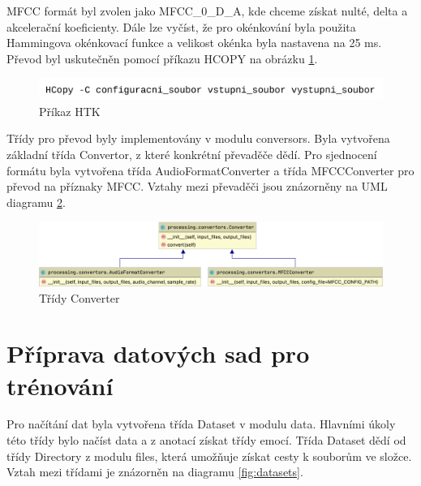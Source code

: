\documentclass[FM,BP]{tulthesis}
\begin{document}
MFCC formát byl zvolen jako MFCC\_0\_D\_A, kde chceme získat nulté, delta a akcelerační koeficienty. Dále lze vyčíst, že pro okénkování byla použita Hammingova okénkovací funkce a velikost okénka byla nastavena na 25 ms. Převod byl uskutečněn pomocí příkazu HCOPY na obrázku \ref{fig:htk}.

\begin{figure}[htbp]
\centerline{\includegraphics[width=\textwidth,height=\textheight,keepaspectratio]{htk_command.png}}
\caption{Příkaz HTK}
\label{fig:htk}
\end{figure}
\FloatBarrier

Třídy pro převod byly implementovány v modulu conversors. Byla vytvořena základní třída Convertor, z které konkrétní převaděče dědí. Pro sjednocení formátu byla vytvořena třída AudioFormatConverter a třída MFCCConverter pro převod na příznaky MFCC. Vztahy mezi převaděči jsou znázorněny na UML diagramu \ref{fig:convertor}.

\begin{figure}[ht]
\centerline{\includegraphics[width=\textwidth,height=\textheight,keepaspectratio]{convertors.png}}
\caption{Třídy Converter}
\label{fig:convertor}
\end{figure}
\FloatBarrier

\section{Příprava datových sad pro trénování} %
Pro načítání dat byla vytvořena třída Dataset v modulu data. Hlavními úkoly této třídy bylo načíst data a z anotací získat třídy emocí. Třída Dataset dědí od třídy Directory z modulu files, která umožňuje získat cesty k souborům ve složce. Vztah mezi třídami je znázorněn na diagramu \ref{fig:datasets}.
\end{document}
